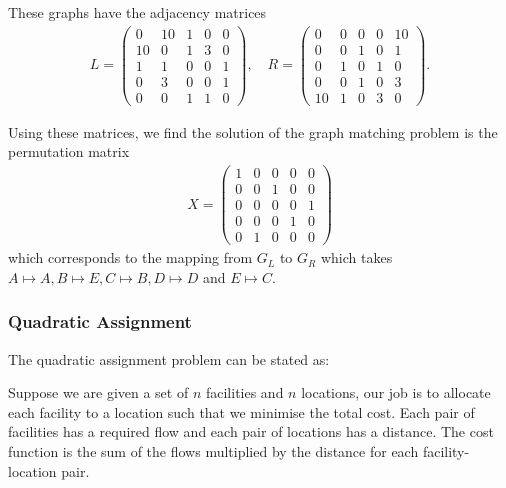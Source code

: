 \documentclass{article}
\begin{document}
\noindent These graphs have the adjacency matrices
\begin{align*}
    L = \begin{pmatrix}
        0 & 10 & 1 & 0 & 0 \\
        10 & 0 & 1 & 3 & 0 \\
        1 & 1 & 0 & 0 & 1 \\
        0 & 3 & 0 & 0 & 1 \\
        0 & 0 & 1 & 1 & 0
    \end{pmatrix}, \quad R = \begin{pmatrix}
        0 & 0 & 0 & 0 & 10 \\
        0 & 0 & 1 & 0 & 1 \\
        0 & 1 & 0 & 1 & 0 \\
        0 & 0 & 1 & 0 & 3 \\
        10 & 1 & 0 & 3 & 0
    \end{pmatrix}.
\end{align*}

\noindent Using these matrices, we find the solution of the graph matching problem is the permutation matrix
\begin{align*}
    X = \begin{pmatrix}
        1 & 0 & 0 & 0 & 0 \\
        0 & 0 & 1 & 0 & 0 \\
        0 & 0 & 0 & 0 & 1 \\
        0 & 0 & 0 & 1 & 0 \\
        0 & 1 & 0 & 0 & 0
    \end{pmatrix}
\end{align*}
which corresponds to the mapping from \(G_L\) to \(G_R\) which takes \(A \mapsto A, B \mapsto E, C \mapsto B, D \mapsto D\) and \(E \mapsto C\).


\subsubsection{Quadratic Assignment}

The quadratic assignment problem can be stated as:

Suppose we are given a set of \(n\) facilities and \(n\) locations, our job is to allocate each facility to a location such that we minimise the total cost. Each pair of facilities has a required flow and each pair of locations has a distance. The cost function is the sum of the flows multiplied by the distance for each facility-location pair.\\
\end{document}
